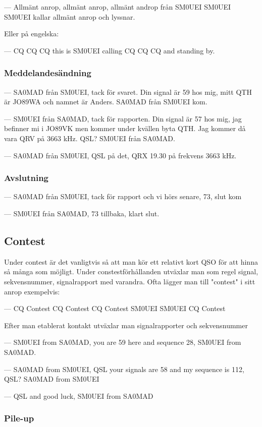 --- Allmänt anrop, allmänt anrop, allmänt androp från SM0UEI SM0UEI SM0UEI kallar allmänt anrop och lyssnar.

Eller på engelska:

--- CQ CQ CQ this is SM0UEI calling CQ CQ CQ and standing by.

\subsubsection{Meddelandesändning}

--- SA0MAD från SM0UEI, tack för svaret. Din signal är 59 hos mig, mitt QTH är JO89WA och namnet är Anders. SA0MAD från SM0UEI kom.

--- SM0UEI från SA0MAD, tack för rapporten. Din signal är 57 hos mig, jag befinner mi i JO89VK men kommer under kvällen byta QTH. Jag kommer då vara QRV på 3663 kHz. QSL? SM0UEI från SA0MAD.

--- SA0MAD från SM0UEI, QSL på det, QRX 19.30 på frekvens 3663 kHz. 

\subsubsection{Avslutning}

--- SA0MAD från SM0UEI, tack för rapport och vi hörs senare, 73, slut kom

--- SM0UEI från SA0MAD, 73 tillbaka, klart slut.

\subsection{Contest}

Under contest är det vanligtvis så att man kör ett relativt kort QSO för att hinna så många som möjligt. Under constestförhållanden utväxlar man som regel signal, sekvensnummer, signalrapport med varandra. Ofta lägger man till "contest" i sitt anrop exempelvis:

--- CQ Contest CQ Contest CQ Contest SM0UEI SM0UEI CQ Contest

Efter man etablerat kontakt utväxlar man signalrapporter och sekvensnummer

--- SM0UEI from SA0MAD, you are 59 here and sequence 28, SM0UEI from SA0MAD.

--- SA0MAD from SM0UEI, QSL your signals are 58 and my sequence is 112, QSL? SA0MAD from SM0UEI

--- QSL and good luck, SM0UEI from SA0MAD

\subsubsection{Pile-up}

